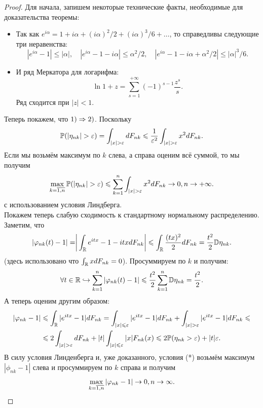 \begin{proof}
    Для начала, запишем некоторые технические факты, необходимые для доказательства теоремы:
    \begin{itemize}
        \item Так как $e^{i \alpha} = 1 + i \alpha + (i\alpha)^2/2 + (i \alpha)^3/6 + \ldots$, то справедливы следующие три неравенства:
        \[
            |e^{i\alpha} - 1| \leq |\alpha|, \quad |e^{i\alpha} - 1 - i \alpha| \leq \alpha^2/2, \quad |e^{i\alpha} - 1 - i\alpha + \alpha^2/2| \leq |\alpha|^3/6.
        \]
        \item И ряд Меркатора для логарифма:
        \[
            \ln 1 + z = \sum\limits_{s = 1}^{+\infty} (-1)^{s - 1}\dfrac{z^s}{s}.
        \]
        Ряд сходится при $|z| < 1$.
    \end{itemize}
    Теперь покажем, что $1) \Ra 2)$.
    Поскольку
    \[
        \P(|\eta_{nk}| > \epsilon) = \int_{|x| > \epsilon} dF_{nk} \leq \dfrac{1}{\epsilon^2} \int_{|x| > \epsilon}x^2 dF_{nk}.
    \]
    Если мы возьмём максимум по $k$ слева, а справа оценим всё суммой, то мы получим
    \[
        \max\limits_{k = \overline{1, n}} \P(|\eta_{nk}| > \epsilon) \leq \sum\limits_{k = 1}^{n} \int_{|x| > \epsilon} x^2 dF_{nk} \ra 0, n \ra +\infty.
    \]
    с использованием условия Линдберга. \\
    Покажем теперь слабую сходимость к стандартному нормальному распределению.
    Заметим, что
    \[
        |\phi_{nk}(t) - 1| = \biggr|\int_\R e^{itx} - 1 - itx dF_{nk}\biggr| \leq \int_\R \dfrac{(tx)^2}{2}dF_{nk} = \dfrac{t^2}{2}\D \eta_{nk}.
    \]
    (здесь использовано что $\int_\R xdF_{nk} = 0$). 
    Просуммируем по $k$ и получим:
    \[
        \forall t \in \R \hookrightarrow \sum\limits_{k = 1}^{n} |\phi_{nk}(t) - 1| \leq \dfrac{t^2}{2}\sum\limits_{k = 1}^{n} \D\eta_{nk} = \dfrac{t^2}{2}.
    \]
    А теперь оценим другим образом:
    \begin{multline*}
        |\phi_{nk} - 1| \leq \int_\R |e^{itx} - 1|dF_{nk} = \int_{|x| \leq \epsilon} |e^{itx} - 1|dF_{nk} + \int_{|x| > \epsilon} |e^{itx} - 1|dF_{nk} \leq \\ \leq 2\int_{|x| > \epsilon}dF_{nk} + |t|\int_{|x| \leq \epsilon} |x|F_{nk}(x) \leq 2\P(\eta_{nk} > \epsilon) + |t|\epsilon.
    \end{multline*}
    В силу условия Линденберга и, уже доказанного, условия (*) возьмём максимум $|\phi_{nk} - 1|$ слева и просуммируем по $k$ справа и получим
    \[
        \max\limits_{k = \overline{1, n}}|\phi_{nk} - 1| \ra 0, n \ra \infty.
\]
\end{proof}
